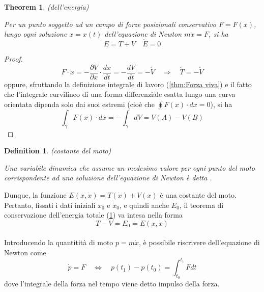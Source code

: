 \documentclass{article}
\newtheorem{theorem}{Theorem}[section]
\newtheorem{definition}{Definition}[section]
\begin{document}
            \begin{theorem}(dell'energia)
                \label{thm:Conservazione dell'energia}

                Per un punto soggetto ad un campo di forze posizionali conservativo $F = F(x)$, lungo ogni soluzione $x = x(t)$ dell'equazione di Newton $m \ddot{x} = F$, 
                si ha \[ E = T + V \quad \dot{E} = 0 \]
                
            \end{theorem}
            \begin{proof}

                \[ F \cdot \dot{x} = - \frac{\partial V}{\partial x} \cdot \frac{dx}{dt} = - \frac{dV}{dt} = - \dot{V} \quad \Longrightarrow \quad \dot{T} = -\dot{V} \]
                oppure, sfruttando la definizione integrale di lavoro (\ref{thm:Forza viva}) e il fatto che l'integrale curvilineo di una forma differenziale esatta
                lungo una curva orientata dipenda solo dai suoi estremi (cioè che $\oint F(x) \cdot dx = 0$), si ha
                \[ \int_{\gamma}F(x) \cdot dx = - \int_{\gamma} dV = V(A) - V(B) \]

            \end{proof}
            
            \begin{definition}(costante del moto)
                \label{def:costante del moto}

                Una variabile dinamica che assume un medesimo valore per ogni punto del moto corrispondente ad una soluzione dell'equazione di Newton è detta .
            
            \end{definition}
            Dunque, la funzione $E(x, \dot{x}) = T(\dot{x}) + V(x)$ è una costante del moto. Pertanto, fissati i dati iniziali $x_0$ e $\dot{x}_0$, e quindi anche $E_0$,
            il teorema di conservazione dell'energia totale (\ref{thm:Conservazione dell'energia}) va intesa nella forma \[ T - V = E_0 = E(x, \dot{x})\] \\
            Introducendo la quantitità di moto $p = m \dot{x}$, è possibile riscrivere dell'equazione di Newton come \[ \dot{p} = F \quad \Longleftrightarrow \quad p(t_1) - p(t_0) = \int_{t_0}^{t_1} F dt \] 
            dove l'integrale della forza nel tempo viene detto impulso della forza. \\
\end{document}

